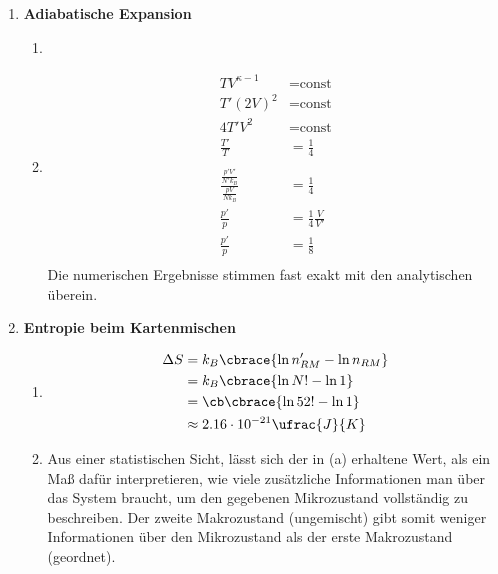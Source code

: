 \documentclass[11pt,letterpaper]{article}
\begin{document}
\begin{enumerate}
\begin{enumerate}
        \end{enumerate}
    
    \item \textbf{Adiabatische Expansion}
        \begin{enumerate}
            \item {}%

            \item
            \begin{align*}
                TV^{\kappa-1} &= \text{const}\\
                T'(2V)^{2} &= \text{const}\\
                4T'V^{2} &= \text{const}\\
                \frac{T'}{T} &= \frac{1}{4}\\
                \\
                \frac{\frac{p' V'}{N' k_B}}{\frac{p V}{N k_B}} &= \frac{1}{4}\\
                \frac{p'}{p} &= \frac{1}{4} \frac{V}{V'}\\
                \frac{p'}{p} &= \frac{1}{8}\\
            \end{align*}
            Die numerischen Ergebnisse stimmen fast exakt mit den analytischen überein.

        \end{enumerate}
    
    \item \textbf{Entropie beim Kartenmischen}
        \begin{enumerate}
            \item 
            \begin{align*}
                \Delta S &= k_B \cbrace{\ln n_{RM}'- \ln n_{RM}}\\
                &= k_B \cbrace{\ln N!- \ln 1}\\ 
                &= \cb \cbrace{\ln 52!- \ln 1}\\ 
                &\approx 2.16\cdot 10^{-21} \ufrac{J}{K} 
            \end{align*}

            \item 
            Aus einer statistischen Sicht, lässt sich der in (a) erhaltene Wert, als ein
            Maß dafür interpretieren, wie viele zusätzliche Informationen man über das System
            braucht, um den gegebenen Mikrozustand vollständig zu beschreiben. Der zweite Makrozustand
            (ungemischt) gibt somit weniger Informationen über den Mikrozustand als der erste 
            Makrozustand (geordnet).


\end{enumerate}
\end{enumerate}
\end{document}
